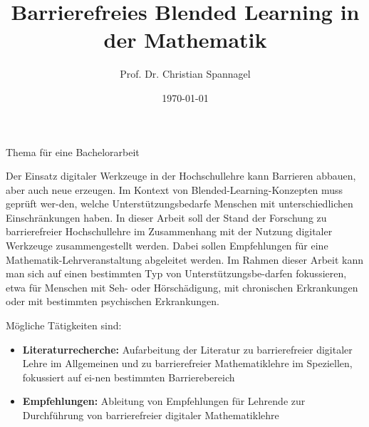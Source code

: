 \documentclass{../cssheet}
\title{Barrierefreies Blended Learning in der Mathematik}
\author{Prof. Dr. Christian Spannagel}
\date{\today}
\begin{document}
\vspace*{5mm}
\begin{center}
{\Large Thema für eine Bachelorarbeit}
\end{center}

\printtitle
\vspace*{1cm}

Der Einsatz digitaler Werkzeuge in der Hochschullehre kann Barrieren abbauen, aber auch neue erzeugen. Im Kontext von Blended-Learning-Konzepten muss geprüft wer-den, welche Unterstützungsbedarfe Menschen mit unterschiedlichen Einschränkungen haben. In dieser Arbeit soll der Stand der Forschung zu barrierefreier Hochschullehre im Zusammenhang mit der Nutzung digitaler Werkzeuge zusammengestellt werden. Dabei sollen Empfehlungen für eine Mathe\-ma\-tik-Lehr\-ver\-an\-stal\-tung abgeleitet werden. Im Rahmen dieser Arbeit kann man sich auf einen bestimmten Typ von Unterstützungsbe-darfen fokussieren, etwa für Menschen mit Seh- oder Hörschädigung, mit chronischen Erkrankungen oder mit bestimmten psychischen Erkrankungen.

Mögliche Tätigkeiten sind:
\begin{itemize}
\item \textbf{Literaturrecherche:} Aufarbeitung der Literatur zu barrierefreier digitaler Lehre im Allgemeinen und zu barrierefreier Mathematiklehre im Speziellen, fokussiert auf ei-nen bestimmten Barrierebereich
\item \textbf{Empfehlungen:} Ableitung von Empfehlungen für Lehrende zur Durchführung von barrierefreier digitaler Mathematiklehre
\end{itemize}

\vspace*{10mm}

\printlicense

\printsocials
\end{document}
